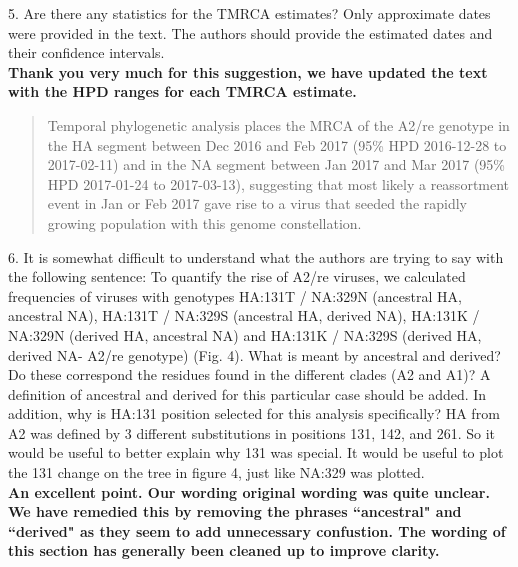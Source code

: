 \documentclass[11pt,oneside,letterpaper]{article}
\begin{document}
5. Are there any statistics for the TMRCA estimates? Only approximate dates were provided in the text. The authors should provide the estimated dates and their confidence intervals.\\

\textbf{Thank you very much for this suggestion, we have updated the text with the HPD ranges for each TMRCA estimate.}

\begin{quotation}
  Temporal phylogenetic analysis places the MRCA of the A2/re genotype in the HA segment between Dec 2016 and Feb 2017 (95\% HPD 2016-12-28 to 2017-02-11) and in the NA segment between Jan 2017 and Mar 2017 (95\% HPD 2017-01-24 to 2017-03-13), suggesting that most likely a reassortment event in Jan or Feb 2017 gave rise to a virus that seeded the rapidly growing population with this genome constellation.
\end{quotation}

6. It is somewhat difficult to understand what the authors are trying to say with the following sentence: To quantify the rise of A2/re viruses, we calculated frequencies of viruses with genotypes HA:131T / NA:329N (ancestral HA, ancestral NA), HA:131T / NA:329S (ancestral HA, derived NA), HA:131K / NA:329N (derived HA, ancestral NA) and HA:131K / NA:329S (derived HA, derived NA- A2/re genotype) (Fig. 4). What is meant by ancestral and derived? Do these correspond the residues found in the different clades (A2 and A1)? A definition of ancestral and derived for this particular case should be added. In addition, why is HA:131 position selected for this analysis specifically? HA from A2 was defined by 3 different substitutions in positions 131, 142, and 261. So it would be useful to better explain why 131 was special. It would be useful to plot the 131 change on the tree in figure 4, just like NA:329 was plotted.\\

\textbf{An excellent point. Our wording original wording was quite unclear. We have remedied this by removing the phrases ``ancestral" and ``derived" as they seem to add unnecessary confustion. The wording of this section has generally been cleaned up to improve clarity.}
\end{document}

